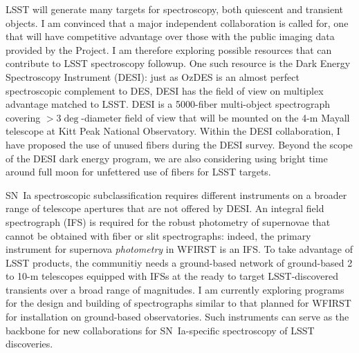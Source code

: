 \documentclass{article}
\begin{document}
LSST will generate many targets for spectroscopy, both quiescent and transient objects.  I am convinced that
a major independent collaboration is called for, one that will have competitive advantage over those with the
public imaging data provided by the Project.
I am therefore exploring possible resources that can contribute to LSST spectroscopy followup.
One such resource is the Dark Energy Spectroscopy Instrument (DESI):
just as OzDES is an almost perfect spectroscopic complement to  DES, 
DESI has the field of view on multiplex advantage matched to LSST.
DESI is a 5000-fiber multi-object spectrograph covering $>3\deg$-diameter
field of view that will be mounted on the 4-m Mayall telescope at Kitt Peak National Observatory.   Within the DESI collaboration, I have proposed the use of unused fibers during the
DESI survey. Beyond the scope of the DESI dark energy program, we are also considering using bright time around full moon
for unfettered use of fibers for LSST targets.

SN~Ia spectroscopic subclassification requires different instruments on a broader range of
telescope apertures that are not offered by DESI.  An integral field spectrograph (IFS) is required for
the robust photometry of supernovae that cannot be obtained with fiber or slit spectrographs:
indeed, the primary  instrument for supernova {\it photometry} in WFIRST is an IFS.  To take
advantage of LSST products, the communitiy needs a ground-based
network of ground-based 2 to 10-m telescopes equipped with  IFSs at the ready to
target LSST-discovered transients over a broad range of magnitudes.  I am currently exploring
programs for the design and building of spectrographs similar to that planned for WFIRST for installation on ground-based
observatories.  Such instruments can serve as the backbone for
new collaborations
for SN~Ia-specific spectroscopy of LSST discoveries. 
\end{document}
